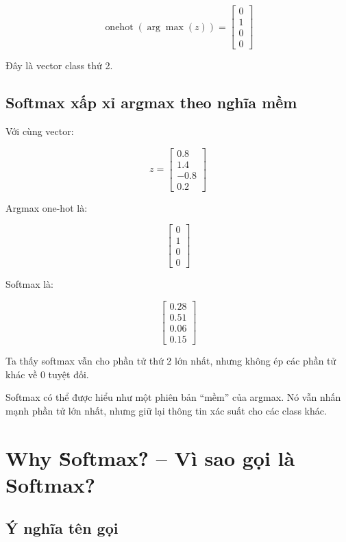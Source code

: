 \[
    \operatorname{onehot}(\arg\max(z))
    =
    \begin{bmatrix}
    0\\
    1\\
    0\\
    0
    \end{bmatrix}
\]

Đây là vector class thứ 2.

\subsection{Softmax xấp xỉ argmax theo nghĩa mềm}

Với cùng vector:

\[
    z =
    \begin{bmatrix}
    0.8\\
    1.4\\
    -0.8\\
    0.2
    \end{bmatrix}
\]

Argmax one-hot là:

\[
    \begin{bmatrix}
    0\\
    1\\
    0\\
    0
    \end{bmatrix}
\]

Softmax là:

\[
    \begin{bmatrix}
    0.28\\
    0.51\\
    0.06\\
    0.15
    \end{bmatrix}
\]

Ta thấy softmax vẫn cho phần tử thứ 2 lớn nhất, nhưng không ép các phần tử khác về 0 tuyệt đối.

\begin{ghinho}
Softmax có thể được hiểu như một phiên bản ``mềm'' của argmax. Nó vẫn nhấn mạnh phần tử lớn nhất, nhưng giữ lại thông tin xác suất cho các class khác.
\end{ghinho}

\section{Why \"Softmax\"? -- Vì sao gọi là Softmax?}

\subsection{Ý nghĩa tên gọi}

